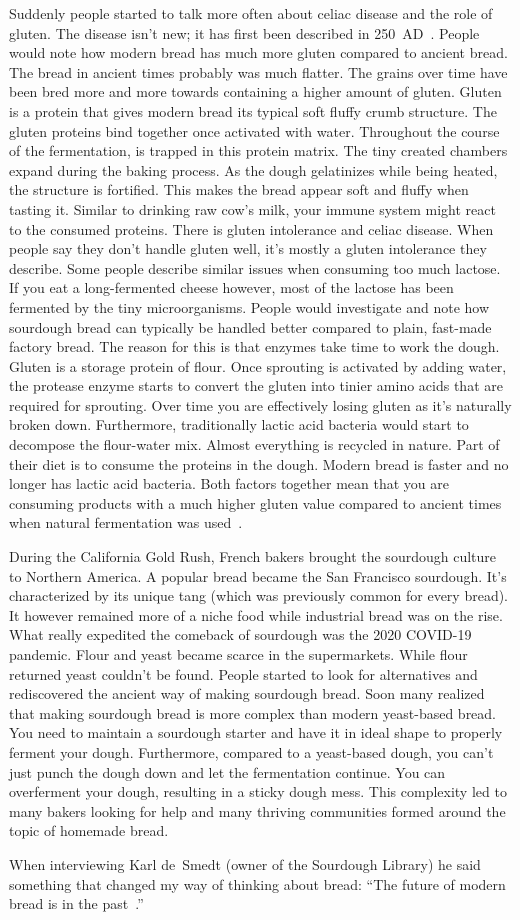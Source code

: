 Suddenly people started to talk more often about celiac disease
and the role of gluten. The disease isn't new; it has first
been described in \num{250}~AD~\cite{coeliac+disease}. People
would note how modern bread has much more gluten compared
to ancient bread. The bread in ancient times probably was much flatter.
The grains over time have been bred more and more towards containing a higher
amount of gluten. Gluten is a protein that gives modern
bread its typical soft fluffy crumb structure. The
gluten proteins bind together once activated with water.
Throughout the course of the fermentation,  is trapped
in this protein matrix. The tiny created chambers expand
during the baking process. As the dough gelatinizes while
being heated, the structure is fortified. This makes the bread appear
soft and fluffy when tasting it. Similar to drinking raw cow's milk,
your immune system might react to the consumed proteins.
There is gluten intolerance
and celiac disease. When people say they don't handle
gluten well, it's mostly a gluten intolerance they describe.
Some people describe similar issues when consuming
too much lactose. If you eat a long-fermented cheese
however, most of the lactose has been fermented by
the tiny microorganisms. People would investigate and
note how sourdough bread can typically be handled better
compared to plain, fast-made factory bread. The
reason for this is that enzymes take time to work the dough.
Gluten is a storage protein of flour. Once
sprouting is activated by adding water, the protease
enzyme starts to convert the gluten into tinier amino acids
that are required for sprouting. Over time you are effectively
losing gluten as it's naturally broken down. Furthermore,
traditionally lactic acid bacteria would start to decompose
the flour-water mix. Almost everything is recycled in nature.
Part of their diet is to consume the proteins in the dough.
Modern bread is faster and no longer has lactic acid bacteria.
Both factors together mean that you are consuming products
with a much higher gluten value compared to ancient times
when natural fermentation was used~\cite{raffaella+di+cagno}.

During the California Gold Rush, French bakers brought the sourdough
culture to Northern America. A popular bread became the
San Francisco sourdough. It's characterized by its unique
tang (which was previously common for every bread). It
however remained more of a niche food while industrial bread
was on the rise. What really expedited
the comeback of sourdough was the \num{2020} COVID-19 pandemic.
Flour and yeast became scarce in the supermarkets. While
flour returned yeast couldn't be found. People started
to look for alternatives and rediscovered the ancient
way of making sourdough bread. Soon many realized
that making sourdough bread is more complex than modern
yeast-based bread. You need to maintain a sourdough starter
and have it in ideal shape to properly ferment your dough.
Furthermore, compared to a yeast-based dough, you can't just
punch the dough down and let the fermentation continue.
You can overferment your dough, resulting in a sticky
dough mess. This complexity led to many bakers looking
for help and many thriving communities formed around
the topic of homemade bread.

When interviewing Karl de~Smedt (owner of the Sourdough
Library) he said something that changed my way of thinking
about bread: ``The future of
modern bread is in the past~\cite{interview+karl+de+smedt}.''
